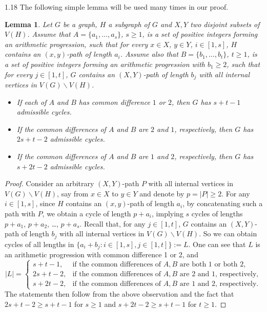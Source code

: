 \documentclass[10pt]{article}
\newtheorem{lemma}[theorem]{Lemma}
\let\geq\geqslant
\begin{document}
\begin{spacing}{1.18}
The following simple lemma will be used many times in our proof.

\begin{lemma}\label{lemma: concatenating paths}
    Let $G$ be a graph, $H$ a subgraph of $G$ and $X,Y$ two disjoint subsets of $V(H)$. Assume that $A=\{a_1,\ldots,a_s\}$, $s\geq 1$, is a set of positive integers forming an arithmetic progression, such that for every $x\in X$, $y\in Y$, $i\in [1,s]$, $H$ contains an $(x,y)$-path of length $a_i$. Assume also that $B=\{b_1,\ldots,b_t\}$, $t\geq 1$, is a set of positive integers forming an arithmetic progression with $b_1\geqslant 2$, such that for every $j\in [1,t]$, $G$ contains an $(X,Y)$-path of length $b_j$ with all internal vertices in $V(G)\backslash V(H)$. 
    \begin{itemize}
        \item[(1)] If each of $A$ and $B$ has common difference $1$ or $2$, then $G$ has $s+t-1$ admissible cycles.
        \item[(2)] If the common differences of $A$ and $B$ are $2$ and $1$, respectively, then $G$ has $2s+t-2$ admissible cycles.
        \item[(3)] If the common differences of $A$ and $B$ are $1$ and $2$, respectively, then $G$ has $s+2t-2$ admissible cycles.
    \end{itemize}
\end{lemma}

\begin{proof}
    Consider an arbitrary $(X,Y)$-path $P$ with all internal vertices in $V(G)\backslash V(H)$, say from $x\in X$ to $y\in Y$ and denote by $p=|P|\geqslant 2$. For any $i\in [1,s]$, since $H$ contains an $(x,y)$-path of length $a_i$, by concatenating such a path with $P$, we obtain a cycle of length $p+a_i$, implying $s$ cycles of lengths $p+a_1$, $p+a_2$, \ldots, $p+a_s$. Recall that, for any $j\in [1,t]$, $G$ contains an $(X,Y)$-path of length $b_j$ with all internal vertices in $V(G)\backslash V(H)$. So we can obtain cycles of all lengths in $\{a_i+b_j: i\in [1,s], j\in [1,t]\}:=L$. One can see that $L$ is an arithmetic progression with common difference 1 or 2, and
    \[
      |L| = 
      \begin{cases}
      s+t-1,    & \text{if the common differences of $A,B$ are both $1$ or both $2$}, \\
      2s + t-2, & \text{if the common differences of $A,B$ are $2$ and $1$, respectively}, \\
      s+2t-2,   & \text{if the common differences of $A,B$ are $1$ and $2$, respectively}.
      \end{cases}
    \]
    The statements then follow from the above observation and the fact that $2s+t-2\geqslant s+t-1$ for $s\geqslant 1$ and $s+2t-2\geqslant s+t-1$ for $t\geqslant 1$.
\end{proof}


\end{spacing}
\end{document}
